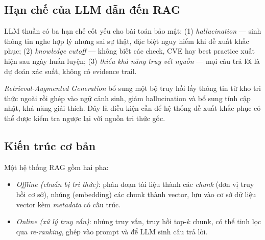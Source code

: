 \subsection{Hạn chế của LLM dẫn đến RAG}
\label{subsec:rag-motivation}

LLM thuần có ba hạn chế cốt yếu cho bài toán bảo mật: (1) \textit{hallucination} --- sinh thông tin nghe hợp lý nhưng sai sự thật, đặc biệt nguy hiểm khi đề xuất khắc phục; (2) \textit{knowledge cutoff} --- không biết các check, CVE hay best practice xuất hiện sau ngày huấn luyện; (3) \textit{thiếu khả năng truy vết nguồn} --- mọi câu trả lời là dự đoán xác suất, không có evidence trail.

\textit{Retrieval-Augmented Generation} \cite{lewis2020rag} bổ sung một bộ truy hồi lấy thông tin từ kho tri thức ngoài rồi ghép vào ngữ cảnh sinh, giảm hallucination và bổ sung tính cập nhật, khả năng giải thích. Đây là điều kiện cần để hệ thống đề xuất khắc phục có thể được kiểm tra ngược lại với nguồn tri thức gốc.

\subsection{Kiến trúc cơ bản}
\label{subsec:rag-arch}

Một hệ thống RAG gồm hai pha:
\begin{itemize}
  \item \textit{Offline (chuẩn bị tri thức)}: phân đoạn tài liệu thành các \textit{chunk} (đơn vị truy hồi cơ sở), nhúng (embedding) các chunk thành vector, lưu vào cơ sở dữ liệu vector kèm \textit{metadata} có cấu trúc.
  \item \textit{Online (xử lý truy vấn)}: nhúng truy vấn, truy hồi top-$k$ chunk, có thể tinh lọc qua \textit{re-ranking}, ghép vào prompt và để LLM sinh câu trả lời.
\end{itemize}

